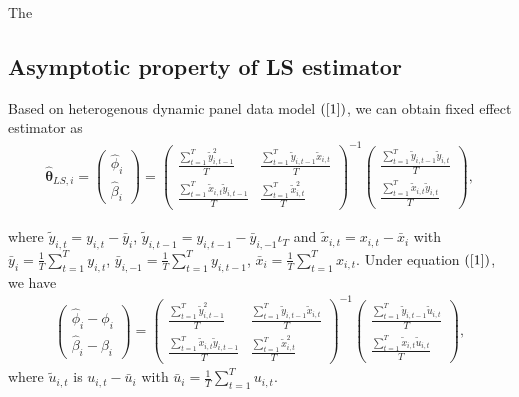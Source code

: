 \documentclass[12pt,a4paper,hyperref]{article}
\begin{document}
The 



\subsection{Asymptotic property of LS estimator}


Based on heterogenous dynamic panel data model $(\ref{1})$, we can obtain fixed effect estimator as
\begin{align}
\hat{\boldsymbol{\theta}}_{LS,i}=
\begin{pmatrix}
\hat{\phi}_{i} \\
\hat{\beta}_{i}
\end{pmatrix}=
\begin{pmatrix}
\frac{\sum^{T}_{t=1}\tilde{y}^{2}_{i,t-1}}{T} & \frac{\sum^{T}_{t=1}\tilde{y}_{i,t-1}\tilde{x}_{i,t}}{T} \\
\frac{\sum^{T}_{t=1}\tilde{x}_{i,t}\tilde{y}_{i,t-1}}{T} &  \frac{\sum^{T}_{t=1}\tilde{x}_{i,t}^{2}}{T}
\end{pmatrix}^{-1}
\begin{pmatrix}
\frac{\sum^{T}_{t=1}\tilde{y}_{i,t-1}\tilde{y}_{i,t}}{T} \\
\frac{\sum^{T}_{t=1}\tilde{x}_{i,t}\tilde{y}_{i,t}}{T}
\end{pmatrix},
\end{align}

where $\tilde{y}_{i,t}=y_{i,t}-\bar{y}_{i}$, $\tilde{y}_{i,t-1}=y_{i,t-1}-\bar{y}_{i,-1}\iota_{T}$ and $\tilde{x}_{i,t}=x_{i,t}-\bar{x}_{i}$ with $\bar{y}_{i}=\frac{1}{T}\sum^{T}_{t=1}y_{i,t}$, $\bar{y}_{i,-1}=\frac{1}{T}\sum^{T}_{t=1}y_{i,t-1}$,  $\bar{x}_{i}=\frac{1}{T}\sum^{T}_{t=1}x_{i,t}$.  Under equation $(\ref{1})$, we have
\begin{align}
\begin{pmatrix}
\hat{\phi}_{i}-\phi_{i} \\
\hat{\beta}_{i}-\beta_{i}
\end{pmatrix}=
\begin{pmatrix}
\frac{\sum^{T}_{t=1}\tilde{y}^{2}_{i,t-1}}{T} & \frac{\sum^{T}_{t=1}\tilde{y}_{i,t-1}\tilde{x}_{i,t}}{T} \\
\frac{\sum^{T}_{t=1}\tilde{x}_{i,t}\tilde{y}_{i,t-1}}{T} &  \frac{\sum^{T}_{t=1}\tilde{x}_{i,t}^{2}}{T}
\end{pmatrix}^{-1}
\begin{pmatrix}
\frac{\sum^{T}_{t=1}\tilde{y}_{i,t-1}\tilde{u}_{i,t}}{T} \\
\frac{\sum^{T}_{t=1}\tilde{x}_{i,t}\tilde{u}_{i,t}}{T}
\end{pmatrix},
\end{align}
where $\tilde{u}_{i,t}$ is $u_{i,t}-\bar{u}_{i}$ with $\bar{u}_{i}=\frac{1}{T}\sum^{T}_{t=1}u_{i,t}.$
\end{document}

